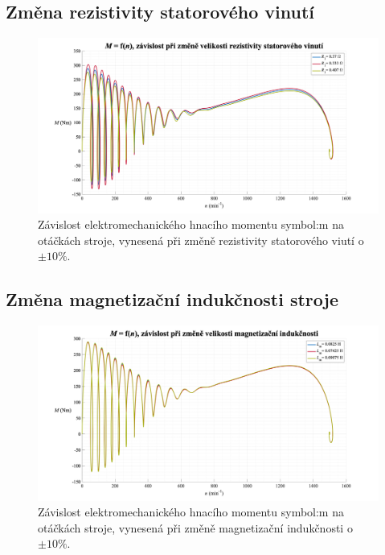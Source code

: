 \documentclass[a4paper, twoside, 11pt]{article}
\newcommand{\fbar}{\FloatBarrier}
\begin{document}
    \subsection{Změna rezistivity statorového vinutí}
        \begin{figure}[htbp!]
            \centering
            \includegraphics[width=1\textwidth]{src/png/mh_dyn_nGraphR1.png}
            \caption{Závislost elektromechanického hnacího momentu \gls{symbol:m} na otáčkách stroje, vynesená při změně rezistivity statorového viutí o~$\pm 10 \%$.}
            \label{fig:mh_dyn_nGraphR1}
        \end{figure}

\newpage

    \fbar
    \subsection{Změna magnetizační indukčnosti stroje}
        \begin{figure}[htbp!]
            \centering
            \includegraphics[width=1\textwidth]{src/png/mh_dyn_nGraphLm.png}
            \caption{Závislost elektromechanického hnacího momentu \gls{symbol:m} na otáčkách stroje, vynesená při změně magnetizační indukčnosti o~$\pm 10 \%$.}
            \label{fig:mh_dyn_nGraphLm}
        \end{figure}
\end{document}
